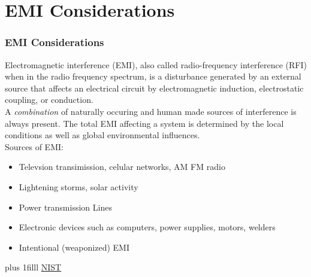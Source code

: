 \documentclass[fleqn]{beamer} %
\newcommand{\sectiontitleII}{EMI Considerations}
\newcommand{\btVFill}{\vskip0pt plus 1filll}
\begin{document}
\section{\sectiontitleII}	

\begin{frame}[label=sectionII] \scriptsize
\frametitle{\sectiontitleII}
\bigskip

{\RD Electromagnetic interference}  (EMI), also called radio-frequency interference (RFI) when in the radio frequency spectrum, is a disturbance generated by an external source that affects an electrical circuit by electromagnetic induction, electrostatic coupling, or conduction. \vspace{5mm}\\


A {\it combination} of naturally occuring and human made sources of interference is always present. The total EMI affecting a system is determined by the local conditions as well as global environmental influences. \vspace{5mm}\\


Sources of EMI:
\begin{itemize}

	\item Televsion transimission, celular networks, AM FM radio 
	\item Lightening storms, solar activity 
	\item Power transmission Lines	
	\item Electronic devices such as computers, power supplies, motors, welders
 
	\item Intentional (weaponized) EMI	

\end{itemize}


\btVFill
\tiny{\href{https://csrc.nist.gov/glossary/term/electromagnetic_interference}{NIST}}		

\end{frame}
\end{document}
